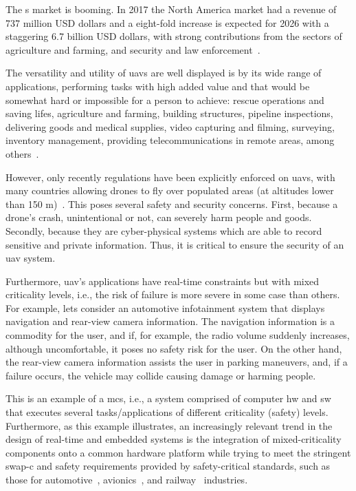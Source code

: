 The s market is booming. In 2017 the North America market had a revenue of
737 million USD dollars and a eight-fold increase is expected for 2026 with a
staggering 6.7 billion USD dollars, with strong contributions from the sectors
of agriculture and farming, and security and law
enforcement~\cite{mohsan2022towards}.

The versatility and utility of \glspl{uav} are well displayed is by its wide
range of applications, performing tasks with high added value and that would be
somewhat hard or impossible for a person to achieve: rescue operations and
saving lifes, agriculture and farming, building structures, pipeline
inspections, delivering goods and medical supplies, video capturing and filming,
surveying, inventory management, providing telecommunications in remote areas,
among others~\cite{alladi2022UAVBlockain}.

However, only recently regulations have been explicitly enforced on \glspl{uav},
with many countries allowing drones to fly over populated areas (at altitudes
lower than 150 m)~\cite{nassi2021sok}. This poses several safety and security
concerns. First, because a drone's crash, unintentional or not, can severely
harm people and goods. Secondly, because they are cyber-physical systems which
are able to record sensitive and private information. Thus,
it is critical to ensure the security of an \gls{uav} system.

Furthermore, \gls{uav}'s applications have real-time constraints but with mixed
criticality levels, i.e., the risk of failure is more severe in some case than others.
For example, lets consider an automotive infotainment system that displays
navigation and rear-view camera information. The navigation information is a
commodity for the user, and if, for example, the radio volume suddenly
increases, although uncomfortable, it poses no safety risk for the user. On the
other hand, the rear-view camera information assists the user in parking
maneuvers, and, if a failure occurs, the vehicle may collide causing damage or
harming people.

This is an example of a \gls{mcs}, i.e., a system comprised of computer
\gls{hw} and \gls{sw} that executes several tasks/applications of different
criticality (safety) levels. Furthermore, as this example illustrates, an increasingly relevant trend in the design of real-time and embedded systems
is the integration of mixed-criticality components onto a common hardware
platform while trying to meet the stringent \gls{swap-c} and safety requirements
provided by safety-critical standards, such as those for automotive~\cite{iso26262}, avionics~\cite{rtca1992software},
and railway~\cite{cenelec201250128} industries.

